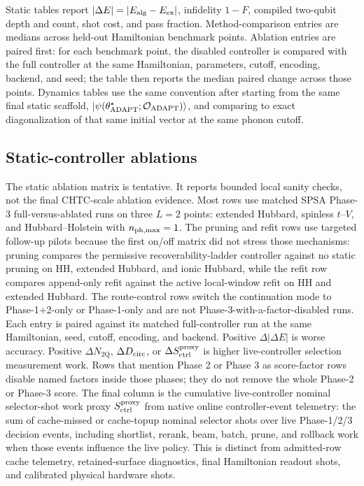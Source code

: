 \documentclass[
  reprint,
  amsmath,
  amssymb,
  aps,
  pra,
  nofootinbib,
  superscriptaddress,
  floatfix
]{revtex4-2}
\newcommand{\Oset}{\mathcal{O}}
\newcommand{\ex}{\mathrm{ex}}
\newcommand{\twq}{\mathrm{2Q}}
\newcommand{\ket}[1]{|#1\rangle}
\begin{document}
Static tables report $|\Delta E|=|E_{\rm alg}-E_{\ex}|$, infidelity $1-F$, compiled two-qubit depth and count, shot cost, and pass fraction. Method-comparison entries are medians across held-out Hamiltonian benchmark points. Ablation entries are paired first: for each benchmark point, the disabled controller is compared with the full controller at the same Hamiltonian, parameters, cutoff, encoding, backend, and seed; the table then reports the median paired change across those points. Dynamics tables use the same convention after starting from the same final static scaffold, $\ket{\psi(\theta_{\rm ADAPT}^{\star};\Oset_{\rm ADAPT})}$, and comparing to exact diagonalization of that same initial vector at the same phonon cutoff.



\subsection{Static-controller ablations}
\begingroup\color{red}

The static ablation matrix is tentative. It reports bounded local sanity checks, not the final CHTC-scale ablation evidence. Most rows use matched SPSA Phase-3 full-versus-ablated runs on three $L=2$ points: extended Hubbard, spinless $t$--$V$, and Hubbard--Holstein with $n_{\rm ph,max}=1$. The pruning and refit rows use targeted follow-up pilots because the first on/off matrix did not stress those mechanisms: pruning compares the permissive recoverability-ladder controller against no static pruning on HH, extended Hubbard, and ionic Hubbard, while the refit row compares append-only refit against the active local-window refit on HH and extended Hubbard. The route-control rows switch the continuation mode to Phase-1+2-only or Phase-1-only and are not Phase-3-with-a-factor-disabled runs. Each entry is paired against its matched full-controller run at the same Hamiltonian, seed, cutoff, encoding, and backend. Positive $\Delta|\Delta E|$ is worse accuracy. Positive $\Delta N_{\twq}$, $\Delta D_{\rm circ}$, or $\Delta S_{\rm ctrl}^{\rm proxy}$ is higher live-controller selection measurement work. Rows that mention Phase 2 or Phase 3 as score-factor rows disable named factors inside those phases; they do not remove the whole Phase-2 or Phase-3 score. The final column is the cumulative live-controller nominal selector-shot work proxy $S_{\rm ctrl}^{\rm proxy}$ from native online controller-event telemetry: the sum of cache-missed or cache-topup nominal selector shots over live Phase-1/2/3 decision events, including shortlist, rerank, beam, batch, prune, and rollback work when those events influence the live policy. This is distinct from admitted-row cache telemetry, retained-surface diagnostics, final Hamiltonian readout shots, and calibrated physical hardware shots.
\end{document}
